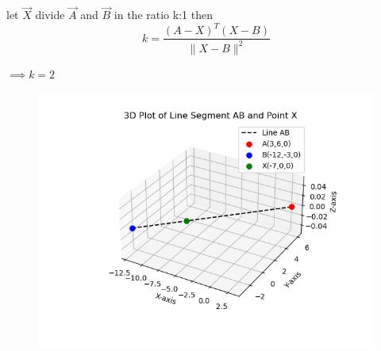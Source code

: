 \documentclass[journal]{IEEEtran}
\begin{document}
let $\vec{X}$ divide $\vec{A}$ and $\vec{B}$ in the ratio k:1 then \\
\begin{equation}
k = \frac{(A - X)^T (X - B)}{\|X - B\|^2}
\end{equation}

\begin{center}
$\implies k = 2$
\end{center}
\begin{figure}[H]
\begin{center}
\includegraphics[width=0.6\columnwidth]{Figs/Fig1.png}
\end{center}
\caption{}
\label{fig:Fig.1}
\end{figure}
\end{document}
